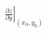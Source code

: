 \documentclass[preview]{standalone}
\begin{document}
\begin{align*}
\left.\frac{\partial z}{\partial y}\right|_{(x_0,y_0)}
\end{align*}
\end{document}
